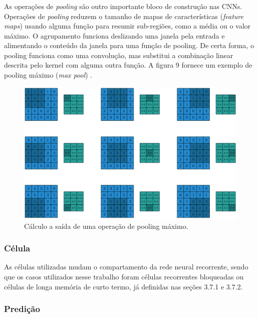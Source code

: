 \documentclass[12pt]{article}
\begin{document}
\subsubsection{}

As operações de \textit{pooling} são outro importante bloco de construção nas CNNs. Operações de \textit{pooling} reduzem o tamanho de mapas de características (\textit{feature maps}) usando alguma função para resumir sub-regiões, como a média ou o valor máximo. O agrupamento funciona deslizando uma janela pela entrada e alimentando o conteúdo da janela para uma função de pooling. De certa forma, o pooling funciona como uma convolução, mas substitui a combinação linear descrita pelo kernel com alguma outra função. A figura 9 fornece um exemplo de pooling máximo (\textit{max pool}) \cite{dumoulin2016guide}.

\begin{figure}[!htb]
\centering
\includegraphics[width=.9\textwidth]{images/pooling.png}
\caption{Cálculo a saída de uma operação de pooling máximo. \cite{dumoulin2016guide}}
\label{fig:graph}
\end{figure}

\subsubsection{Célula}

As células utilizadas mudam o compartamento da rede neural recorrente, sendo que os casos utilizados nesse trabalho foram células recorrentes bloqueadas ou células de longa memória de curto termo, já definidas nas seções 3.7.1 e 3.7.2.

\subsubsection{Predição}
\end{document}

